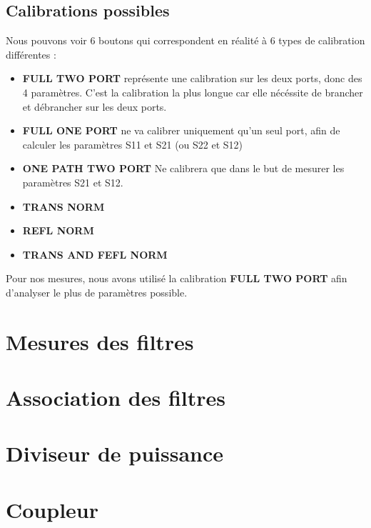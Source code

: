 \documentclass[a4paper,12pt]{report}            %
\begin{document}
\section{Calibrations possibles}
    Nous pouvons voir 6 boutons qui correspondent en réalité à 6 types de calibration
différentes :
\begin{itemize}
    \item \textbf{FULL TWO PORT} représente une calibration sur les deux ports, donc des 4 paramètres.
        C'est la calibration la plus longue car elle nécéssite de brancher et débrancher sur les deux ports.
    \item \textbf{FULL ONE PORT} ne va calibrer uniquement qu'un seul port, afin de calculer les paramètres
        S11 et S21 (ou S22 et S12)
    \item \textbf{ONE PATH TWO PORT} Ne calibrera que dans le but de mesurer les paramètres S21 et S12.
    \item \textbf{TRANS NORM}
    \item \textbf{REFL NORM}
    \item \textbf{TRANS AND FEFL NORM}
\end{itemize}

    Pour nos mesures, nous avons utilisé la calibration \textbf{FULL TWO PORT} afin
d'analyser le plus de paramètres possible.  

\chapter{Mesures des filtres}

\chapter{Association des filtres}

\chapter{Diviseur de puissance}

\chapter{Coupleur}
\end{document}
